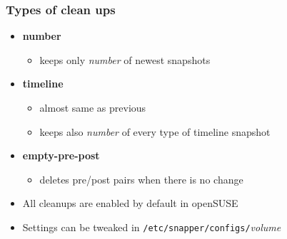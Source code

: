 \documentclass{beamer}
\begin{document}
\begin{frame}[t]
\frametitle{Types of clean ups}
\begin{itemize}
   \item \textbf{number}
   \begin{itemize}
      \item keeps only \textit{number} of newest snapshots
   \end{itemize}
   \item \textbf{timeline}
   \begin{itemize}
      \item almost same as previous
      \item keeps also \textit{number} of every type of timeline snapshot
   \end{itemize}
   \item \textbf{empty-pre-post}
   \begin{itemize}
      \item deletes pre/post pairs when there is no change
   \end{itemize}
   \vspace{.5cm}
   \item All cleanups are enabled by default in openSUSE
   \item Settings can be tweaked in \texttt{/etc/snapper/configs/}\textit{volume}
\end{itemize}
\end{frame}
\end{document}
